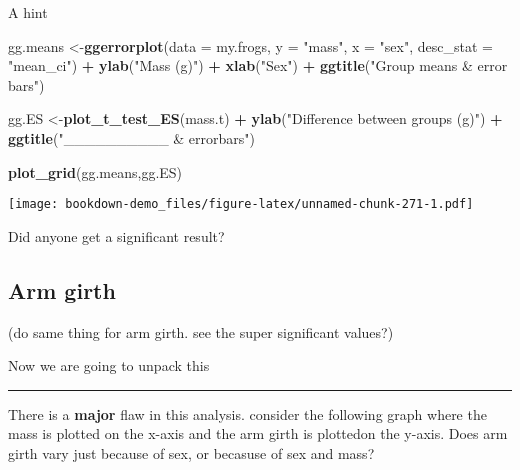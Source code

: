 \documentclass[]{book}
\newenvironment{Shaded}{\begin{snugshade}}{\end{snugshade}}
\newcommand{\KeywordTok}[1]{\textcolor[rgb]{0.13,0.29,0.53}{\textbf{#1}}}
\newcommand{\DataTypeTok}[1]{\textcolor[rgb]{0.13,0.29,0.53}{#1}}
\newcommand{\StringTok}[1]{\textcolor[rgb]{0.31,0.60,0.02}{#1}}
\newcommand{\OperatorTok}[1]{\textcolor[rgb]{0.81,0.36,0.00}{\textbf{#1}}}
\newcommand{\NormalTok}[1]{#1}
\theoremstyle{definition}
\theoremstyle{definition}
\theoremstyle{definition}
\theoremstyle{remark}
\begin{document}
A hint

\begin{Shaded}
\begin{Highlighting}[]
\NormalTok{gg.means <-}\KeywordTok{ggerrorplot}\NormalTok{(}\DataTypeTok{data =}\NormalTok{ my.frogs,}
          \DataTypeTok{y =} \StringTok{"mass"}\NormalTok{,}
          \DataTypeTok{x =} \StringTok{"sex"}\NormalTok{,}
          \DataTypeTok{desc_stat =} \StringTok{"mean_ci"}\NormalTok{) }\OperatorTok{+}
\StringTok{  }\KeywordTok{ylab}\NormalTok{(}\StringTok{"Mass (g)"}\NormalTok{) }\OperatorTok{+}
\StringTok{  }\KeywordTok{xlab}\NormalTok{(}\StringTok{"Sex"}\NormalTok{) }\OperatorTok{+}
\StringTok{  }\KeywordTok{ggtitle}\NormalTok{(}\StringTok{"Group means & error bars"}\NormalTok{)}


\NormalTok{gg.ES <-}\KeywordTok{plot_t_test_ES}\NormalTok{(mass.t) }\OperatorTok{+}
\StringTok{  }\KeywordTok{ylab}\NormalTok{(}\StringTok{"Difference between groups (g)"}\NormalTok{) }\OperatorTok{+}
\StringTok{  }\KeywordTok{ggtitle}\NormalTok{(}\StringTok{"__________ & errorbars"}\NormalTok{)}
\end{Highlighting}
\end{Shaded}

\begin{Shaded}
\begin{Highlighting}[]
\KeywordTok{plot_grid}\NormalTok{(gg.means,gg.ES)}
\end{Highlighting}
\end{Shaded}

\texttt{[image: bookdown-demo\_files/figure-latex/unnamed-chunk-271-1.pdf]}

Did anyone get a significant result?

\subsection{Arm girth}\label{arm-girth}

(do same thing for arm girth. see the super significant values?)

Now we are going to unpack this

\begin{center}\rule{0.5\linewidth}{\linethickness}\end{center}

There is a \textbf{major} flaw in this analysis. consider the following
graph where the mass is plotted on the x-axis and the arm girth is
plottedon the y-axis. Does arm girth vary just because of sex, or
becasuse of sex and mass?
\end{document}
